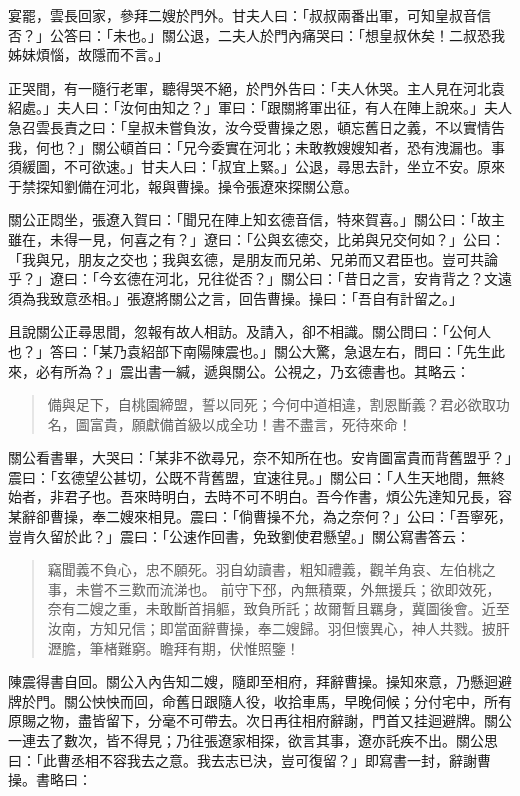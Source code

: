 宴罷，雲長回家，參拜二嫂於門外。甘夫人曰：「叔叔兩番出軍，可知皇叔音信否？」公答曰：「未也。」關公退，二夫人於門內痛哭曰：「想皇叔休矣！二叔恐我姊妹煩惱，故隱而不言。」

正哭間，有一隨行老軍，聽得哭不絕，於門外告曰：「夫人休哭。主人見在河北袁紹處。」夫人曰：「汝何由知之？」軍曰：「跟關將軍出征，有人在陣上說來。」夫人急召雲長責之曰：「皇叔未嘗負汝，汝今受曹操之恩，頓忘舊日之義，不以實情告我，何也？」關公頓首曰：「兄今委實在河北；未敢教嫂嫂知者，恐有洩漏也。事須緩圖，不可欲速。」甘夫人曰：「叔宜上緊。」公退，尋思去計，坐立不安。原來于禁探知劉備在河北，報與曹操。操令張遼來探關公意。

關公正悶坐，張遼入賀曰：「聞兄在陣上知玄德音信，特來賀喜。」關公曰：「故主雖在，未得一見，何喜之有？」遼曰：「公與玄德交，比弟與兄交何如？」公曰：「我與兄，朋友之交也；我與玄德，是朋友而兄弟、兄弟而又君臣也。豈可共論乎？」遼曰：「今玄德在河北，兄往從否？」關公曰：「昔日之言，安肯背之？文遠須為我致意丞相。」張遼將關公之言，回告曹操。操曰：「吾自有計留之。」

且說關公正尋思間，忽報有故人相訪。及請入，卻不相識。關公問曰：「公何人也？」答曰：「某乃袁紹部下南陽陳震也。」關公大驚，急退左右，問曰：「先生此來，必有所為？」震出書一緘，遞與關公。公視之，乃玄德書也。其略云：

\begin{quote}
備與足下，自桃園締盟，誓以同死；今何中道相違，割恩斷義？君必欲取功名，圖富貴，願獻備首級以成全功！書不盡言，死待來命！
\end{quote}

關公看書畢，大哭曰：「某非不欲尋兄，奈不知所在也。安肯圖富貴而背舊盟乎？」震曰：「玄德望公甚切，公既不背舊盟，宜速往見。」關公曰：「人生天地間，無終始者，非君子也。吾來時明白，去時不可不明白。吾今作書，煩公先達知兄長，容某辭卻曹操，奉二嫂來相見。震曰：「倘曹操不允，為之奈何？」公曰：「吾寧死，豈肯久留於此？」震曰：「公速作回書，免致劉使君懸望。」關公寫書答云：

\begin{quote}
竊聞義不負心，忠不願死。羽自幼讀書，粗知禮義，觀羊角哀、左伯桃之事，未嘗不三歎而流涕也。
前守下邳，內無積粟，外無援兵；欲即效死，奈有二嫂之重，未敢斷首捐軀，致負所託；故爾暫且羈身，冀圖後會。近至汝南，方知兄信；即當面辭曹操，奉二嫂歸。羽但懷異心，神人共戮。披肝瀝膽，筆楮難窮。瞻拜有期，伏惟照鑒！
\end{quote}

陳震得書自回。關公入內告知二嫂，隨即至相府，拜辭曹操。操知來意，乃懸迴避牌於門。關公怏怏而回，命舊日跟隨人役，收拾車馬，早晚伺候；分付宅中，所有原賜之物，盡皆留下，分毫不可帶去。次日再往相府辭謝，門首又挂迴避牌。關公一連去了數次，皆不得見；乃往張遼家相探，欲言其事，遼亦託疾不出。關公思曰：「此曹丞相不容我去之意。我去志已決，豈可復留？」即寫書一封，辭謝曹操。書略曰：


